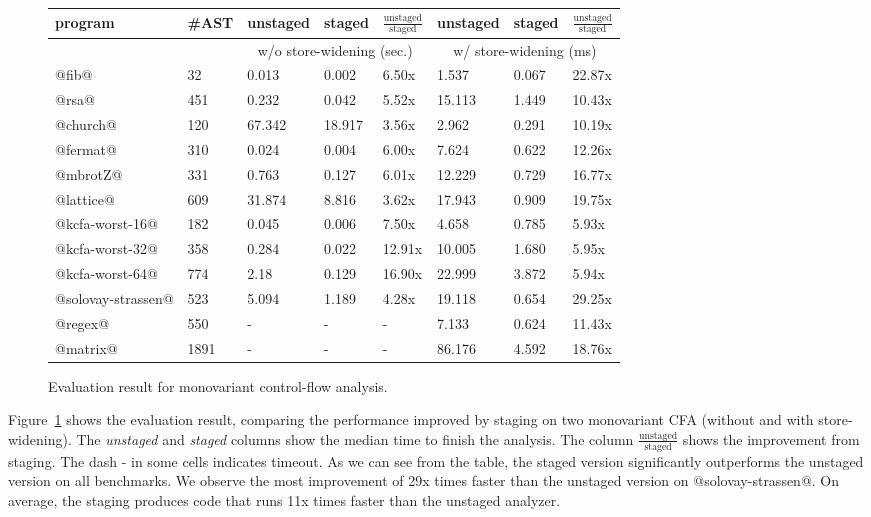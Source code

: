 \begin{figure}[h]
\footnotesize
\begin{tabular}{@{}ll|lll|lll@{}}
\toprule
    program             &\#AST & unstaged   & staged     & $\frac{\text{unstaged}}{\text{staged}}$ & unstaged   & staged    & $\frac{\text{unstaged}}{\text{staged}}$  \\ 
    \midrule
                        &      & \multicolumn{3}{c}{w/o store-widening (sec.)}  &  \multicolumn{3}{c}{w/ store-widening (ms)}\\
    \midrule
    @fib@               & 32   & 0.013      & 0.002      & 6.50x      & 1.537 & 0.067  &  22.87x       \\
    @rsa@               & 451  & 0.232      & 0.042      & 5.52x      & 15.113& 1.449 &  10.43x       \\
    @church@            & 120  & 67.342     & 18.917     & 3.56x      & 2.962 & 0.291 &  10.19x       \\
    @fermat@            & 310  & 0.024      & 0.004      & 6.00x      & 7.624 & 0.622 &  12.26x       \\
    @mbrotZ@            & 331  & 0.763      & 0.127      & 6.01x      & 12.229& 0.729 &  16.77x       \\
    @lattice@           & 609  & 31.874     & 8.816      & 3.62x      & 17.943& 0.909 &  19.75x      \\
    @kcfa-worst-16@     & 182  & 0.045      & 0.006      & 7.50x      & 4.658 & 0.785 &  5.93x     \\
    @kcfa-worst-32@     & 358  & 0.284      & 0.022      & 12.91x     & 10.005& 1.680 &  5.95x     \\
    @kcfa-worst-64@     & 774  & 2.18       & 0.129      & 16.90x     & 22.999& 3.872 &  5.94x     \\
    @solovay-strassen@  & 523  & 5.094      & 1.189      & 4.28x      & 19.118& 0.654 &  29.25x      \\
    @regex@             & 550  & -          & -          & -          & 7.133 & 0.624 &  11.43x      \\
    @matrix@            & 1891 & -          & -          & -          & 86.176& 4.592 &  18.76x      \\
    \bottomrule
\end{tabular}
\caption{Evaluation result for monovariant control-flow analysis.} \label{evaluation_result}
\end{figure}

Figure~\ref{evaluation_result} shows the evaluation result, comparing the
performance improved by staging on two monovariant CFA (without and with store-widening). The
\textit{unstaged} and \textit{staged} columns show the median time to finish the
analysis. The column $\frac{\text{unstaged}}{\text{staged}}$
shows the improvement from staging. The dash - in some cells indicates timeout.
As we can see from the table, the staged version significantly outperforms the
unstaged version on all benchmarks. %
We observe the most improvement of 29x times faster than the unstaged version on
@solovay-strassen@. On average, the staging produces code that runs 11x times faster
than the unstaged analyzer.

